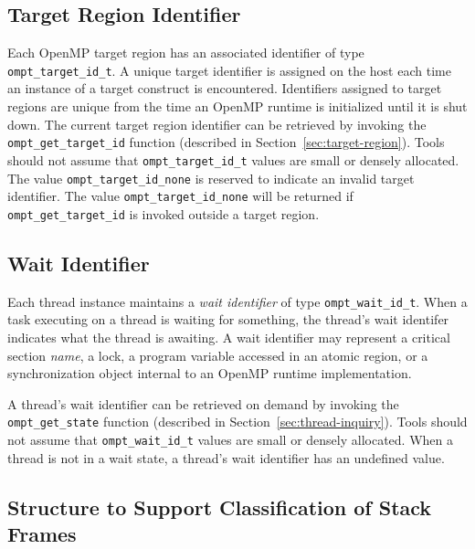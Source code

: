 \documentclass{article}
\begin{document}
\subsection{Target Region Identifier}
Each OpenMP target region has an associated identifier of type \verb|ompt_target_id_t|. 
A unique target identifier is assigned on the host each time an instance of a target construct is encountered.  
Identifiers assigned to target regions are unique from the time an OpenMP runtime is initialized until it is shut down. 
The current target region identifier can be retrieved by invoking the \verb|ompt_get_target_id| function (described in Section~\ref{sec:target-region}).
Tools should not assume that \verb|ompt_target_id_t| values are small or densely allocated. 
The value \verb|ompt_target_id_none| is reserved to indicate an invalid target identifier. The value \verb|ompt_target_id_none| will be returned if \verb|ompt_get_target_id| is invoked outside a target region.

\subsection{Wait Identifier}
Each thread instance maintains a {\em wait identifier} of type \verb|ompt_wait_id_t|. 
When a task executing on a thread is waiting for something, the thread's wait identifer indicates what the thread is awaiting. 
A wait identifier may represent a critical section {\em name}, a lock,  a program variable accessed in an atomic region, or a synchronization object internal to an OpenMP runtime implementation. 

A thread's wait identifier can be retrieved on demand by invoking the \verb|ompt_get_state| function (described in Section~\ref{sec:thread-inquiry}).
Tools should not assume that \verb|ompt_wait_id_t| values are small or densely allocated. 
When a thread is not in a wait state, a thread's wait identifier has an undefined value.
 
\subsection{Structure to Support Classification of Stack Frames}
\end{document}
